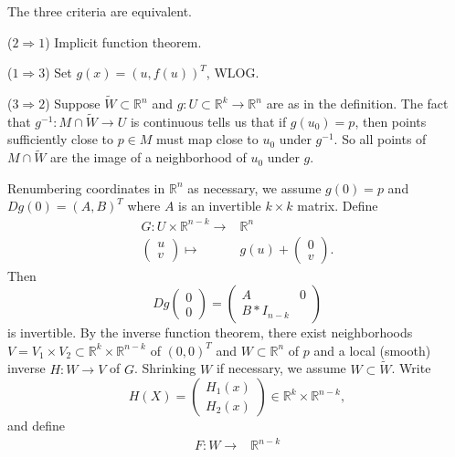 \documentclass[12pt]{article}
\begin{document}
\begin{theorem}
	The three criteria are equivalent.

	($2\Rightarrow 1$) Implicit function theorem.

	($1\Rightarrow 3$) Set $g(x)=(u, f(u))^T$, WLOG.

	($3\Rightarrow 2$) Suppose $\tilde{W}\subset\mathbb{R}^n$ and $g:U\subset\mathbb{R}^k\to\mathbb{R}^n$ are as in the definition. The fact that $g^{-1}:M\cap\tilde{W}\to U$ is continuous tells us that if $g(u_0)=p$, then points sufficiently close to $p\in M$ must map close to $u_0$ under $g^{-1}$. So all points of $M\cap\tilde{W}$ are the image of a neighborhood of $u_0$ under $g$.

	Renumbering coordinates in $\mathbb{R}^n$ as necessary, we assume $g(0)=p$ and $Dg(0) = (A, B)^T$ where $A$ is an invertible $k\times k$ matrix. Define 
	\begin{align*}
		G:U\times\mathbb{R}^{n-k} \to& \mathbb{R}^n \\
		\begin{pmatrix}u\\ v\end{pmatrix} \mapsto& g(u) + \begin{pmatrix} 0 \\ v\end{pmatrix}.
	\end{align*}
	Then 
	\begin{equation*}
		Dg\begin{pmatrix}0\\ 0\end{pmatrix} = \begin{pmatrix}A & 0\\ B* I_{n-k}\end{pmatrix}
	\end{equation*}
	is invertible. By the inverse function theorem, there exist neighborhoods $V=V_1\times V_2\subset\mathbb{R}^k\times\mathbb{R}^{n-k}$ of $(0,0)^T$ and $W\subset\mathbb{R}^n$ of $p$ and a local (smooth) inverse $H:W\to V$ of $G$. Shrinking $W$ if necessary, we assume $W\subset\tilde{W}$. Write 
	\begin{equation*}
		H(X) = \begin{pmatrix} H_1(x) \\ H_2(x) \end{pmatrix} \in \mathbb{R}^k\times\mathbb{R}^{n-k},
	\end{equation*}
	and define 
	\begin{align*}
		F: W\to& \mathbb{R}^{n-k} \\ 

\end{align*}
\end{theorem}
\end{document}
